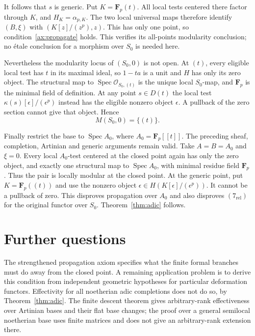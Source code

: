 \documentclass[11pt]{article}
\theoremstyle{definition}\newtheorem{definition}[theorem]{Definition}
\theoremstyle{remark}\newtheorem{remark}[theorem]{Remark}
\newcommand{\OO}{\mathcal O}
\newcommand{\F}{\mathbf F}
\newcommand{\Spec}{\operatorname{Spec}}
\begin{document}
It follows that $s$ is generic. Put $K=\F_p(t)$. All local tests centered there factor through $K$, and $H_K=\alpha_{p,K}$. The two local universal maps therefore identify $(B,\xi)$ with $(K[z]/(z^p),z)$. This has only one point, so condition~\ref{ax:propagate} holds. This verifies its all-points modularity conclusion; no \'etale conclusion for a morphism over $S_0$ is needed here.

Nevertheless the modularity locus of $(S_0,0)$ is not open. At $(t)$, every eligible local test has $t$ in its maximal ideal, so $1-ta$ is a unit and $H$ has only its zero object. The structural map to $\Spec\OO_{S_0,(t)}$ is the unique local $S_0$-map, and $\F_p$ is the minimal field of definition. At any point $s\in D(t)$ the local test $\kappa(s)[\epsilon]/(\epsilon^p)$ instead has the eligible nonzero object $\epsilon$. A pullback of the zero section cannot give that object. Hence
\[
 M(S_0,0)=\{(t)\}.
\]

Finally restrict the base to $\Spec A_0$, where $A_0=\F_p[[t]]$. The preceding sheaf, completion, Artinian and generic arguments remain valid. Take $A=B=A_0$ and $\xi=0$. Every local $A_0$-test centered at the closed point again has only the zero object, and exactly one structural map to $\Spec A_0$, with minimal residue field $\F_p$. Thus the pair is locally modular at the closed point. At the generic point, put $K=\F_p((t))$ and use the nonzero object $\epsilon\in H(K[\epsilon]/(\epsilon^p))$. It cannot be a pullback of zero. This disproves propagation over $A_0$ and also disproves $(7_{\mathrm{rel}})$ for the original functor over $S_0$. Theorem~\ref{thm:adic} follows.




\section{Further questions}

The strengthened propagation axiom specifies what the finite formal branches must do away from the closed point. A remaining application problem is to derive this condition from independent geometric hypotheses for particular deformation functors. Effectivity for all noetherian adic completions does not do so, by Theorem~\ref{thm:adic}. The finite descent theorem gives arbitrary-rank effectiveness over Artinian bases and their flat base changes; the proof over a general semilocal noetherian base uses finite matrices and does not give an arbitrary-rank extension there.
\end{document}
